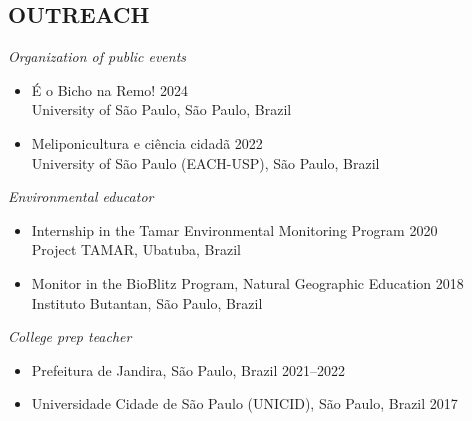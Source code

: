 \documentclass[margin, 10pt]{res} %
\begin{document}
\begin{resume}
\section{OUTREACH}
{\sl Organization of public events}
\begin{itemize}
\item É o Bicho  na Remo! \hfill 2024 \\
University of São Paulo, São Paulo, Brazil
\item Meliponicultura e ciência cidadã \hfill 2022 \\
University of São Paulo (EACH-USP), São Paulo, Brazil
\end{itemize}

{\sl Environmental educator}
\begin{itemize}
\item Internship in the Tamar Environmental Monitoring Program \hfill 2020 \\
Project TAMAR, Ubatuba, Brazil
\item Monitor in the BioBlitz Program, Natural Geographic Education \hfill 2018 \\
Instituto Butantan, São Paulo, Brazil
\end{itemize}

{\sl College prep teacher}
\begin{itemize}
\item Prefeitura de Jandira, São Paulo, Brazil \hfill 2021--2022
\item Universidade Cidade de São Paulo (UNICID), São Paulo, Brazil \hfill 2017
\end{itemize}

\end{resume}
\end{document}
